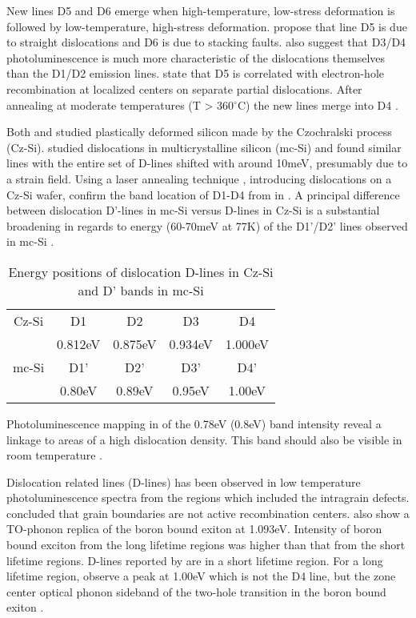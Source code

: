 New lines D5 and D6 emerge when high-temperature, low-stress deformation is followed by low-temperature, high-stress deformation. \cite{sauer85} propose that line D5 is due to straight dislocations and D6 is due to stacking faults. \cite{sauer85} also suggest that D3/D4 photoluminescence is much more characteristic of the dislocations themselves than the D1/D2 emission lines. \cite{weronek91} state that D5 is correlated with electron-hole recombination at localized centers on separate partial dislocations. After annealing at moderate temperatures (T > 360$^\circ$C) the new lines merge into D4 \cite{weronek91}.

Both \cite{drozdov76} and \cite{sauer85} studied plastically deformed silicon made by the Czochralski process (Cz-Si). \cite{tarasov00} studied  dislocations in multicrystalline silicon (mc-Si) and found similar lines with the entire set of D-lines shifted with around 10meV, presumably due to a strain field. Using a laser annealing technique \cite{staiger94}, introducing dislocations on a Cz-Si wafer, confirm the band location of D1-D4 from \cite{sauer85} in \cite{tarasov00}. A principal difference between dislocation D'-lines in mc-Si versus D-lines in Cz-Si is a substantial broadening in regards to energy (60-70meV at 77K) of the D1'/D2' lines observed in mc-Si \cite{tarasov00}.

\begin{table}[H]
\centering
\begin{tabular}{|c|c|c|c|c|}
\hline
Cz-Si \cite{drozdov76} & D1 & D2 & D3 & D4 \\
	& 0.812eV & 0.875eV & 0.934eV & 1.000eV \\
\hline
mc-Si \cite{tarasov00} & D1' & D2' & D3' & D4' \\
		& 0.80eV & 0.89eV & 0.95eV & 1.00eV \\
\hline
\end{tabular}
\caption{Energy positions of dislocation D-lines in Cz-Si and D' bands in mc-Si}
\label{tarasovlines}
\end{table}

Photoluminescence mapping in \cite{tarasov00} of the 0.78eV (0.8eV) band intensity reveal a linkage to areas of a high dislocation density. This band should also be visible in room temperature \cite{tarasov00}.

Dislocation related lines (D-lines) has been observed in low temperature photoluminescence spectra from the regions which included the intragrain defects. \cite{sugimoto06} concluded that grain boundaries are not active recombination centers. \cite{sugimoto06} also show a TO-phonon replica of the boron bound exiton at 1.093eV. Intensity of boron bound exciton from the long lifetime regions was higher than that from the short lifetime regions. D-lines reported by \cite{sauer85} are in a short lifetime region. For a long lifetime region, \cite{sugimoto06} observe a peak at 1.00eV which is not the D4 line, but the zone center optical phonon sideband of the two-hole transition in the boron bound exiton \cite{dean67}. 

